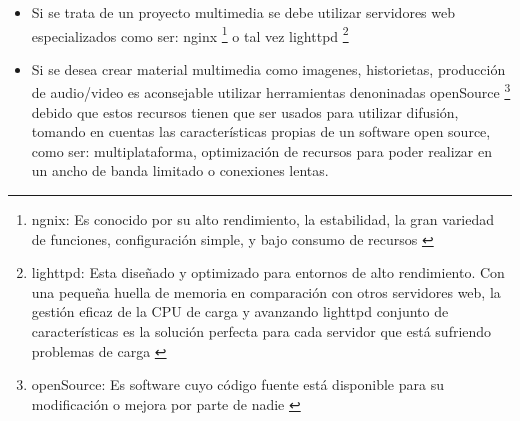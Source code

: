 \begin{itemize}

\item Si se trata de un proyecto multimedia se debe utilizar servidores web 
especializados como ser: nginx \footnote{ngnix: Es conocido por su alto 
rendimiento, la estabilidad, la gran variedad de funciones, configuraci\'{o}n
simple, y bajo consumo de recursos \cite{nginx}}  o tal vez lighttpd \footnote{lighttpd: 
Esta dise\~{n}ado y optimizado para entornos de alto rendimiento. Con una 
peque\~{n}a huella de memoria en comparaci\'{o}n con otros servidores web, la
gesti\'{o}n eficaz de la CPU de carga y avanzando lighttpd conjunto de 
caracter\'{i}sticas es la soluci\'{o}n perfecta para cada servidor que est\'{a}
sufriendo problemas de carga \cite{lighttps}} 
\item Si se desea crear material multimedia como imagenes, historietas, producci\'{o}n
de audio/video es aconsejable utilizar herramientas denoninadas openSource 
\footnote{openSource: Es software cuyo c\'{o}digo fuente est\'{a} disponible 
para su modificaci\'{o}n o mejora por parte de nadie \cite{openSource}}  debido 
que estos recursos tienen que ser usados para utilizar difusi\'{o}n, tomando 
en cuentas las caracter\'{i}sticas propias de un software open source, como 
ser: multiplataforma, optimizaci\'{o}n de recursos para poder realizar en un 
ancho de banda limitado o conexiones lentas. 
\end{itemize}